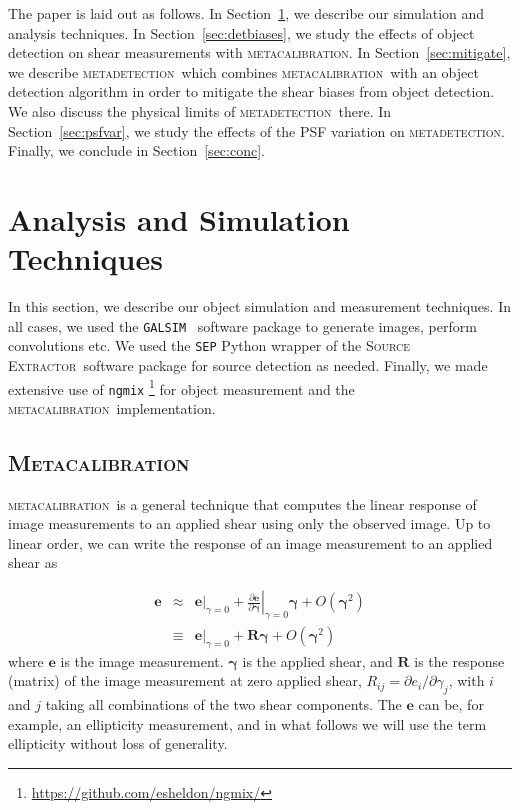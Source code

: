 \documentclass[fleqn,useAMS,usenatbib]{mnras}
\newcommand{\galsim}{\texttt{GALSIM}}
\newcommand{\ngmix}{\texttt{ngmix}}
\newcommand{\mcal}{\textsc{metacalibration}}
\newcommand{\mdet}{\textsc{metadetection}}
\newcommand{\sx}{\textsc{Source Extractor}}
\begin{document}
The paper is laid out as follows. In Section~\ref{sec:sims}, we describe our
simulation and analysis techniques. In Section~\ref{sec:detbiases}, we study
the effects of object detection on shear measurements with \mcal.
In Section~\ref{sec:mitigate}, we describe \mdet\ which combines \mcal\ with
an object detection algorithm in order to mitigate the shear biases from object
detection. We also discuss the physical limits of \mdet\ there.
In Section~\ref{sec:psfvar}, we study the effects of the PSF variation on \mdet.
Finally, we conclude in Section~\ref{sec:conc}.

\section{Analysis and Simulation Techniques}
\label{sec:sims}

In this section, we describe our object simulation and measurement techniques.
In all cases, we used the \galsim\ \citep{GALSIM2015} software package to
generate images, perform convolutions etc. We used the \texttt{SEP} \citep{sep}
Python wrapper of the \sx\ software package \citep{Bertin96} for
source detection as needed. Finally, we made extensive use of \ngmix
\footnote{\url{https://github.com/esheldon/ngmix/}} for object measurement and
the \mcal\ implementation.

\subsection{\textsc{Metacalibration}}
\label{sec:mcal}

\mcal\ is a general technique that computes the linear response of image
measurements to an applied shear using only the observed image. Up to linear
order, we can write the response of an image measurement to an applied shear as

\begin{eqnarray}
\boldsymbol{e} & \approx & \left.\boldsymbol{e}\right|_{\gamma=0} +
                           \left.\frac{\partial \boldsymbol{e}}{\partial\boldsymbol\gamma}\right|_{\gamma=0} \boldsymbol\gamma +
                           O(\boldsymbol\gamma^2)\nonumber\\
               & \equiv  & \left.\boldsymbol{e}\right|_{\gamma=0} +
                           \boldsymbol{R} \boldsymbol\gamma +
                           O(\boldsymbol\gamma^2)
\end{eqnarray}
where $\boldsymbol{e}$ is the image measurement.  $\boldsymbol\gamma$ is the
applied shear, and $\boldsymbol{R}$ is the response (matrix) of the image
measurement at zero applied shear, $R_{ij}=\partial e_i /\partial \gamma_j$,
with $i$ and $j$ taking all combinations of the two shear components.  The
$\boldsymbol{e}$ can be, for example,  an ellipticity measurement, and in what
follows we will use the term ellipticity without loss of generality.
\end{document}
